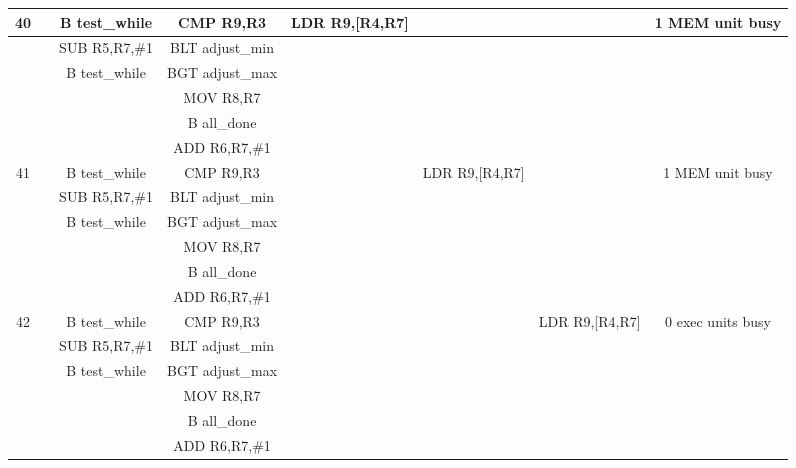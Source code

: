 \documentclass{article}
\begin{document}
{\begin{landscape}
\begin{longtable}{|c|c|c|c|c:c|c|c|}
    40 & & B test\_while & CMP R9,R3 & LDR R9,[R4,R7] & & & 1 MEM unit busy \\ \hline
     & & SUB R5,R7,\#1 & BLT adjust\_min & & & & \\ \hline
     & & B test\_while & BGT adjust\_max & &  & & \\ \hline
     &  &  & MOV R8,R7 & &  & & \\ \hline
     &  &  & B all\_done &  &  &  & \\ \hline
     &  &  & ADD R6,R7,\#1 &  &  &  & \\ \hline \hline
     
    41 & & B test\_while & CMP R9,R3 & & LDR R9,[R4,R7] & & 1 MEM unit busy \\ \hline
     & & SUB R5,R7,\#1 & BLT adjust\_min & & & & \\ \hline
     & & B test\_while & BGT adjust\_max & &  & & \\ \hline
     &  &  & MOV R8,R7 & &  & & \\ \hline
     &  &  & B all\_done &  &  &  & \\ \hline
     &  &  & ADD R6,R7,\#1 &  &  &  & \\ \hline \hline
     
    42 & & B test\_while & CMP R9,R3 & & & LDR R9,[R4,R7] & 0 exec units busy \\ \hline
     & & SUB R5,R7,\#1 & BLT adjust\_min & & & & \\ \hline
     & & B test\_while & BGT adjust\_max & &  & & \\ \hline
     &  &  & MOV R8,R7 & &  & & \\ \hline
     &  &  & B all\_done &  &  &  & \\ \hline
     &  &  & ADD R6,R7,\#1 &  &  &  & \\ \hline \hline
     

\end{longtable}
\end{landscape}}
\end{document}
